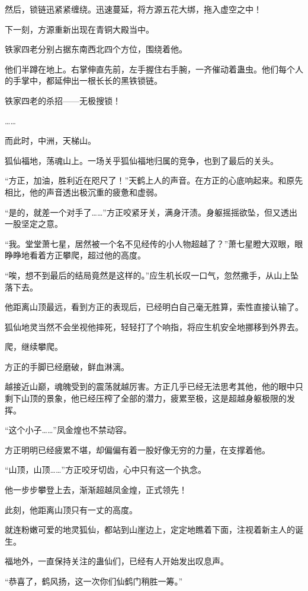 \begin{this_body}
然后，锁链迅紧紧缠绕。迅速蔓延，将方源五花大绑，拖入虚空之中！

下一刻，方源重新出现在青铜大殿当中。

铁家四老分别占据东南西北四个方位，围绕着他。

他们半蹲在地上。右掌伸直先前，左手握住右手腕，一齐催动着蛊虫。他们每个人的手掌中，都延伸出一根长长的黑铁锁链。

铁家四老的杀招——无极搜锁！

……

而此时，中洲，天梯山。

狐仙福地，荡魂山上。一场关乎狐仙福地归属的竞争，也到了最后的关头。

“方正，加油，胜利近在咫尺了！”天鹤上人的声音。在方正的心底响起来。和原先相比，他的声音透出极沉重的疲惫和虚弱。

“是的，就差一个对手了……”方正咬紧牙关，满身汗渍。身躯摇摇欲坠，但又透出一股坚定之意。

“我。堂堂萧七星，居然被一个名不见经传的小人物超越了？”萧七星瞪大双眼，眼睁睁地看着方正攀爬，超过他的高度。

“唉，想不到最后的结局竟然是这样的。”应生机长叹一口气，忽然撒手，从山上坠落下去。

他距离山顶最远，看到方正的表现后，已经明白自己毫无胜算，索性直接认输了。

狐仙地灵当然不会坐视他摔死，轻轻打了个响指，将应生机安全地挪移到外界去。

爬，继续攀爬。

方正的手脚已经磨破，鲜血淋漓。

越接近山巅，魂魄受到的震荡就越厉害。方正几乎已经无法思考其他，他的眼中只剩下山顶的景象，他已经压榨了全部的潜力，疲累至极，这是超越身躯极限的发挥。

“这个小子……”凤金煌也不禁动容。

方正明明已经疲累不堪，却偏偏有着一股好像无穷的力量，在支撑着他。

“山顶，山顶……”方正咬牙切齿，心中只有这一个执念。

他一步步攀登上去，渐渐超越凤金煌，正式领先！

此刻，他距离山顶只有一丈的高度。

就连粉嫩可爱的地灵狐仙，都站到山崖边上，定定地瞧着下面，注视着新主人的诞生。

福地外，一直保持关注的蛊仙们，已经有人开始发出叹息声。

“恭喜了，鹤风扬，这一次你们仙鹤门稍胜一筹。”


\end{this_body}
